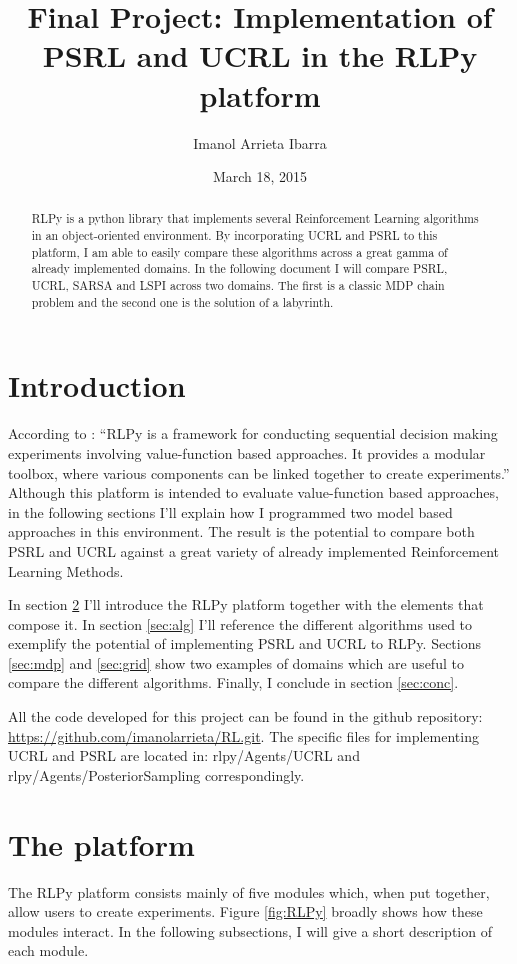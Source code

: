 \documentclass[12pt]{article}
\begin{document}
\title{Final Project: Implementation of PSRL and UCRL in the RLPy platform}
\date{March 18, 2015}
\author{Imanol Arrieta Ibarra}
\maketitle

\begin{abstract}
RLPy is a python library that implements several Reinforcement Learning algorithms in an object-oriented environment. By incorporating UCRL and PSRL to this platform, I am able to easily compare these algorithms across a great gamma of already implemented domains. In the following document I will compare PSRL, UCRL, SARSA and LSPI across two domains. The first is a classic MDP chain problem and the second one is the solution of a labyrinth. 
\end{abstract}

\section{Introduction}
According to \cite{RLPy}: ``RLPy is a framework for conducting sequential decision making experiments involving value-function based approaches. It provides a modular toolbox, where various components can be linked together to create experiments.'' Although this platform is intended to evaluate value-function based approaches, in the following sections I'll explain how I programmed two model based approaches in this environment. The result is the potential to compare both PSRL and UCRL against a great variety of already implemented Reinforcement Learning Methods. 

In section \ref{sec:platform} I'll introduce the RLPy platform together with the elements that compose it. In section \ref{sec:alg} I'll reference the different algorithms used to exemplify the potential of implementing PSRL and UCRL to RLPy. Sections \ref{sec:mdp} and \ref{sec:grid} show two examples of domains which are useful to compare the different algorithms. Finally, I conclude in section \ref{sec:conc}.

All the code developed for this project can be found in the github repository: \url{https://github.com/imanolarrieta/RL.git}. The specific files for implementing UCRL and PSRL are located in: rlpy/Agents/UCRL and rlpy/Agents/PosteriorSampling correspondingly. 



\section{The platform}
\label{sec:platform}
The RLPy platform \citep{RLPy} consists mainly of five modules which, when put together, allow users to create experiments. Figure \ref{fig:RLPy} broadly shows how these modules interact. In the following subsections, I will give a short description of each module.
\end{document}
